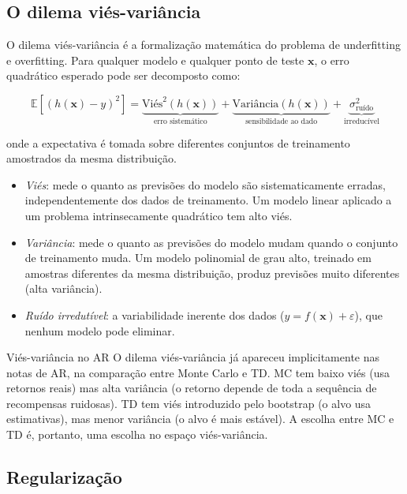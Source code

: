 \documentclass[12pt,a4paper]{article}
\begin{document}
\subsection{O dilema viés-variância}
\label{subsec:bias-variance}

O dilema viés-variância é a formalização matemática do problema de underfitting e overfitting. Para qualquer modelo e qualquer ponto de teste $\mathbf{x}$, o erro quadrático esperado pode ser decomposto como:

\[
\mathbb{E}\left[\left(h(\mathbf{x}) - y\right)^2\right] = \underbrace{\text{Viés}^2(h(\mathbf{x}))}_{\text{erro sistemático}} + \underbrace{\text{Variância}(h(\mathbf{x}))}_{\text{sensibilidade ao dado}} + \underbrace{\sigma^2_{\text{ruído}}}_{\text{irreducível}}
\]

onde a expectativa é tomada sobre diferentes conjuntos de treinamento amostrados da mesma distribuição.

\begin{itemize}
    \item \emph{Viés}: mede o quanto as previsões do modelo são sistematicamente erradas, independentemente dos dados de treinamento. Um modelo linear aplicado a um problema intrinsecamente quadrático tem alto viés.
    \item \emph{Variância}: mede o quanto as previsões do modelo mudam quando o conjunto de treinamento muda. Um modelo polinomial de grau alto, treinado em amostras diferentes da mesma distribuição, produz previsões muito diferentes (alta variância).
    \item \emph{Ruído irredutível}: a variabilidade inerente dos dados ($y = f(\mathbf{x}) + \varepsilon$), que nenhum modelo pode eliminar.
\end{itemize}

\begin{notabox}{Viés-variância no AR}
O dilema viés-variância já apareceu implicitamente nas notas de AR, na comparação entre Monte Carlo e TD. MC tem baixo viés (usa retornos reais) mas alta variância (o retorno depende de toda a sequência de recompensas ruidosas). TD tem viés introduzido pelo bootstrap (o alvo usa estimativas), mas menor variância (o alvo é mais estável). A escolha entre MC e TD é, portanto, uma escolha no espaço viés-variância.
\end{notabox}

\subsection{Regularização}
\label{subsec:regularizacao}
\end{document}
